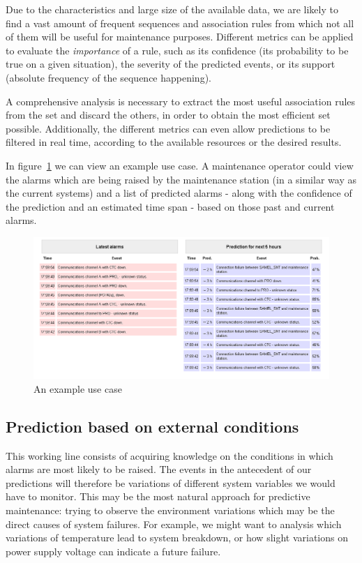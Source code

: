 Due to the characteristics and large size of the available data, we are likely to find a vast amount of frequent sequences and association rules from which not all of them will be useful for maintenance purposes. Different metrics can be applied to evaluate the \emph{importance} of a rule, such as its confidence (its probability to be true on a given situation), the severity of the predicted events, or its support (absolute frequency of the sequence happening).

A comprehensive analysis is necessary to extract the most useful association rules from the set and discard the others, in order to obtain the most efficient set possible. Additionally, the different metrics can even allow predictions to be filtered in real time, according to the available resources or the desired results.

In figure~\ref{fig:demo_view} we can view an example use case. A maintenance operator could view the alarms which are being raised by the maintenance station (in a similar way as the current systems) and a list of predicted alarms - along with the confidence of the prediction and an estimated time span - based on those past and current alarms.

\begin{figure}[hbtp]
\includegraphics[width=\textwidth]{img/demo_thales.png}
\caption{An example use case} \label{fig:demo_view}
\end{figure}

\subsection{Prediction based on external conditions}\label{sec:external}
This working line consists of acquiring knowledge on the conditions in which alarms are most likely to be raised. The events in the antecedent of our predictions will therefore be variations of different system variables we would have to monitor. This may be the most natural approach for predictive maintenance: trying to observe the environment variations which may be the direct causes of system failures. For example, we might want to analysis which variations of temperature lead to system breakdown, or how slight variations on power supply voltage can indicate a future failure.

